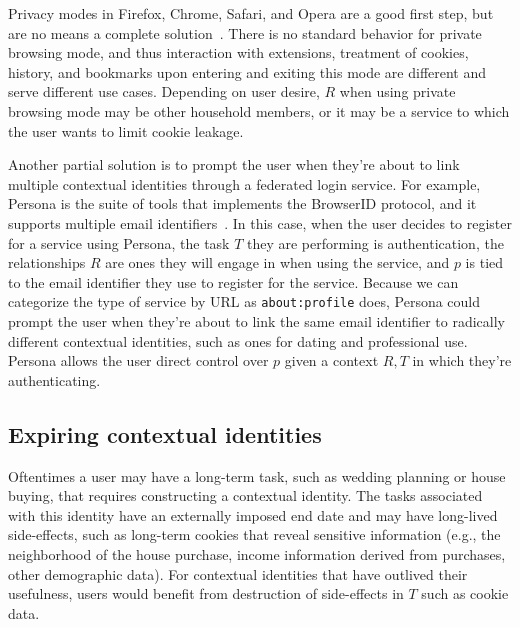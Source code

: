 \documentclass{llncs}
\begin{document}
Privacy modes in Firefox, Chrome, Safari, and Opera are a good first step, but
are no means a complete solution~\cite{ABBJ10}. There is no standard behavior
for private browsing mode, and thus interaction with extensions, treatment of
cookies, history, and bookmarks upon entering and exiting this mode are
different and serve different use cases. Depending on user desire, $R$ when
using private browsing mode may be other household members, or it may be a
service to which the user wants to limit cookie leakage.

Another partial solution is to prompt the user when they're about to link
multiple contextual identities through a federated login service. For example,
Persona is the suite of tools that implements the BrowserID protocol, and it
supports multiple email identifiers~\cite{browserid}. In this case, when the
user decides to register for a service using Persona, the task $T$ they are
performing is authentication, the relationships $R$ are ones they will engage
in when using the service, and $p$ is tied to the email identifier they use to
register for the service. Because we can categorize the type of service by URL
as \texttt{about:profile} does, Persona could prompt the user when they're about
to link the same email identifier to radically different contextual identities,
such as ones for dating and professional use.  Persona allows the user direct
control over $p$ given a context {$R,T$} in which they're authenticating.

\subsection{Expiring contextual identities}
Oftentimes a user may have a long-term task, such as wedding planning or house
buying, that requires constructing a contextual identity. The tasks associated
with this identity have an externally imposed end date and may have long-lived
side-effects, such as long-term cookies that reveal sensitive information
(e.g., the neighborhood of the house purchase, income information derived from
purchases, other demographic data). For contextual identities that have
outlived their usefulness, users would benefit from destruction of side-effects
in $T$ such as cookie data.
\end{document}
